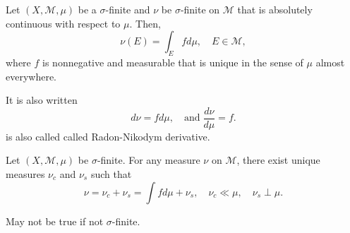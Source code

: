\documentclass[class=book, crop=false]{standalone}
\begin{document}
        \begin{theorem}
            Let $(X, \mathscr{M}, \mu)$ be a $\sigma$-finite and $\nu$ be $\sigma$-finite on $\mathscr{M}$ that is absolutely continuous with respect to $\mu$. Then,
            \begin{equation*}
                \nu(E) = \int_E f d\mu, \quad E \in \mathscr{M},
            \end{equation*}
            where $f$ is nonnegative and measurable that is unique in the sense of $\mu$ almost everywhere.
        \end{theorem}
        \begin{remark}
            It is also written
            \begin{equation*}
                d\nu = f d\mu, \quad \text{and}\; \frac{d\nu}{d\mu} = f.
            \end{equation*}
            is also called called Radon-Nikodym derivative.
        \end{remark}

        \begin{theorem}
            Let $(X, \mathscr{M}, \mu)$ be $\sigma$-finite. For any measure $\nu$ on $\mathscr{M}$, there exist unique measures $\nu_c$ and $\nu_s$ such that
            \begin{equation*}
                \nu = \nu_c + \nu_s = \int f d\mu + \nu_s, \quad \nu_c \ll \mu, \quad \nu_s \perp \mu.
            \end{equation*}
        \end{theorem}
        \begin{remark}
            May not be true if not $\sigma$-finite.
        \end{remark}
        
\end{document}
